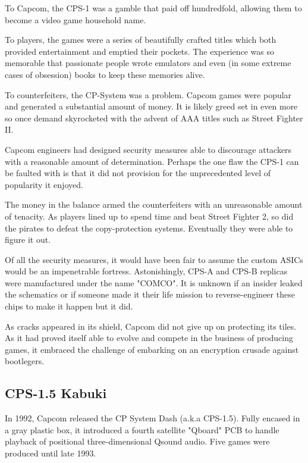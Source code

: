 To Capcom, the CPS-1 was a gamble that paid off hundredfold, allowing them to become a video game household name. 

To players, the games were a series of beautifully crafted titles which both provided entertainment and emptied their pockets. The experience was so memorable that passionate people wrote emulators and even (in some extreme cases of obsession) books to keep these memories alive. 

To counterfeiters, the CP-System was a problem. Capcom games were popular and generated a substantial amount of money. It is likely greed set in even more so once demand skyrocketed with the advent of AAA titles such as Street Fighter II. 

Capcom engineers had designed security measures able to discourage attackers with a reasonable amount of determination. Perhaps the one flaw the CPS-1 can be faulted with is that it did not provision for the unprecedented level of popularity it enjoyed.

The money in the balance armed the counterfeiters with an unreasonable amount of tenacity. As players lined up to spend time and beat Street Fighter 2, so did the pirates to defeat the copy-protection systems. Eventually they were able to figure it out. 


Of all the security measures, it would have been fair to assume the custom ASICs would be an impenetrable fortress. Astonishingly, CPS-A and CPS-B replicas were manufactured under the name "COMCO"\cite{arcadeHackerCPS1}. It is unknown if an insider leaked the schematics or if someone made it their life mission to reverse-engineer these chips to make it happen but it did.

As cracks appeared in its shield, Capcom did not give up on protecting its tiles. As it had proved itself able to evolve and compete in the business of producing games, it embraced the challenge of embarking on an encryption crusade against bootlegers.

\subsection{CPS-1.5 Kabuki}
In 1992, Capcom released the CP System Dash (a.k.a CPS-1.5). Fully encased in a gray plastic box, it introduced a fourth satellite "Qboard" PCB to handle playback of positional three-dimensional Qsound audio. Five games were produced until late 1993.

